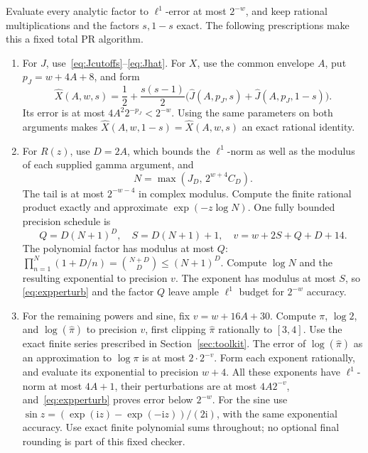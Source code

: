 \documentclass[11pt,letterpaper]{article}
\numberwithin{equation}{section}
\theoremstyle{definition}
\newcommand{\ii}{\mathrm i}
\newcommand{\gamrec}{R}
\newcommand{\Jh}{\widehat J}
\begin{document}
Evaluate every analytic factor to \(\ell^1\)-error at most \(2^{-w}\),
and keep rational multiplications and the factors \(s,1-s\) exact.
The following prescriptions make this a fixed total PR algorithm.

\begin{enumerate}
\item For \(J\), use~\eqref{eq:Jcutoffs}--\eqref{eq:Jhat}.
For \(X\), use the common envelope \(A\), put \(p_J=w+4A+8\), and form
\begin{equation}
 \widehat X(A,w,s)=\frac12+\frac{s(s-1)}2
              \bigl(\Jh(A,p_J,s)+\Jh(A,p_J,1-s)\bigr).
 \label{eq:Xhat}
\end{equation}
Its error is at most \(4A^2 2^{-p_J}<2^{-w}\).
Using the same parameters on both arguments makes
\(\widehat X(A,w,1-s)=\widehat X(A,w,s)\) an exact rational identity.

\item For \(\gamrec(z)\), use \(D=2A\), which bounds the
\(\ell^1\)-norm as well as the modulus of each supplied gamma
argument, and
\[
 N=\max(J_D,\,2^{w+4}C_D).
\]
The tail is at most \(2^{-w-4}\) in complex modulus.
Compute the finite rational product exactly and approximate
\(\exp(-z\log N)\).
One fully bounded precision schedule is
\[
 Q=D(N+1)^D,\quad S=D(N+1)+1,\quad
 v=w+2S+Q+D+14.
\]
The polynomial factor has modulus at most \(Q\):
\(\prod_{n=1}^N(1+D/n)=\binom{N+D}{D}\le(N+1)^D\).
Compute \(\log N\) and the resulting exponential to precision \(v\).
The exponent has modulus at most \(S\), so
\eqref{eq:expperturb} and the factor \(Q\) leave ample
\(\ell^1\) budget for \(2^{-w}\) accuracy.

\item For the remaining powers and sine, fix \(v=w+16A+30\).
Compute \(\pi\), \(\log2\), and
\(\log(\widehat\pi)\) to precision \(v\), first clipping
\(\widehat\pi\) rationally to \([3,4]\). Use the exact finite
series prescribed in Section~\ref{sec:toolkit}.
The error of \(\log(\widehat\pi)\) as an approximation to
\(\log\pi\) is at most \(2\cdot2^{-v}\).
Form each exponent rationally, and evaluate its exponential
to precision \(w+4\). All these exponents have
\(\ell^1\)-norm at most \(4A+1\), their perturbations are at most
\(4A2^{-v}\), and~\eqref{eq:expperturb} proves error below
\(2^{-w}\).
For the sine use
\(\sin z=(\exp(\ii z)-\exp(-\ii z))/(2\ii)\), with the same
exponential accuracy. Use exact finite polynomial sums throughout;
no optional final rounding is part of this fixed checker.
\end{enumerate}
\end{document}
